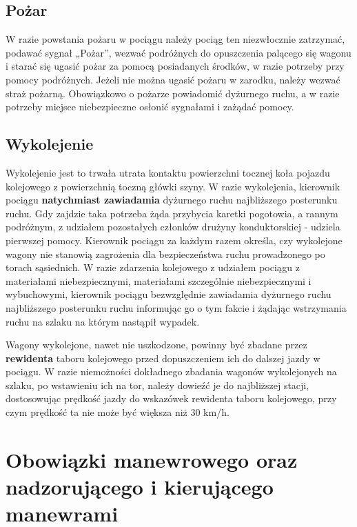 \section{Pożar}
W razie powstania pożaru w pociągu należy pociąg ten niezwłocznie zatrzymać, podawać sygnał „Pożar”, wezwać podróżnych do opuszczenia palącego się wagonu i starać się ugasić pożar za pomocą posiadanych środków, w razie potrzeby przy pomocy podróżnych. Jeżeli nie można ugasić pożaru w zarodku, należy wezwać straż pożarną. Obowiązkowo o pożarze powiadomić dyżurnego ruchu, a w razie potrzeby miejsce niebezpieczne osłonić sygnałami i zażądać pomocy.

\section{Wykolejenie}
Wykolejenie jest to  trwała utrata kontaktu powierzchni tocznej koła pojazdu kolejowego z powierzchnią toczną główki szyny.
W razie wykolejenia, kierownik pociągu \textbf{natychmiast zawiadamia} dyżurnego ruchu najbliższego posterunku ruchu.
Gdy zajdzie taka potrzeba żąda przybycia karetki pogotowia, a rannym podróżnym, z udziałem pozostałych członków drużyny konduktorskiej - udziela pierwszej pomocy. Kierownik pociągu za każdym razem określa, czy wykolejone wagony nie stanowią zagrożenia dla bezpieczeństwa ruchu prowadzonego po torach sąsiednich. W razie zdarzenia kolejowego z udziałem pociągu z materiałami niebezpiecznymi, materiałami szczególnie niebezpiecznymi i wybuchowymi, kierownik pociągu bezwzględnie zawiadamia dyżurnego ruchu najbliższego posterunku ruchu informując go o tym fakcie i żądając wstrzymania ruchu na szlaku na którym nastąpił wypadek.

Wagony wykolejone, nawet nie uszkodzone, powinny być zbadane przez \textbf{rewidenta} taboru kolejowego przed dopuszczeniem ich do dalszej jazdy w pociągu. W razie niemożności dokładnego zbadania wagonów wykolejonych na szlaku, po wstawieniu ich na tor, należy dowieźć je do najbliższej stacji, dostosowując prędkość jazdy do wskazówek rewidenta taboru kolejowego, przy czym prędkość ta nie może być większa niż 30 km/h.

\chapter{Obowiązki manewrowego oraz nadzorującego i kierującego manewrami}

